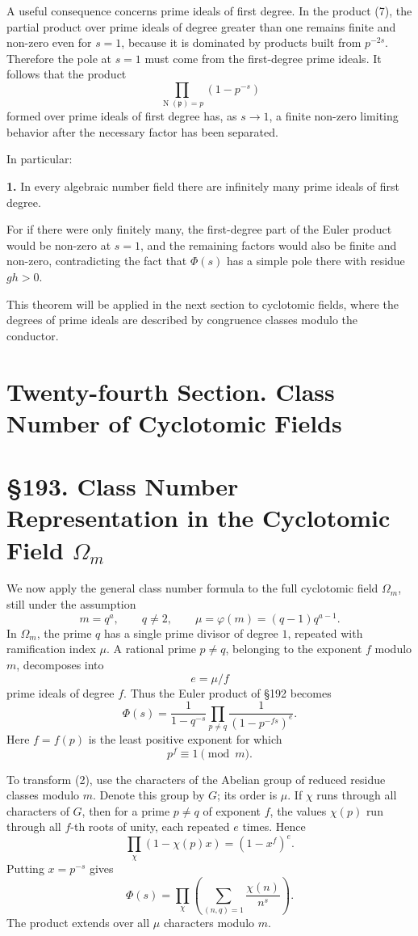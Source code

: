 \documentclass[12pt,a4paper]{article}
\newcommand{\webersection}[2]{\clearpage\section*{\S #1. #2}}
\newcommand{\booktitle}[1]{\clearpage\section*{#1}}
\newcommand{\Om}{\Omega_m}
\newcommand{\idealp}{\mathfrak p}
\newcommand{\N}{\operatorname{N}}
\begin{document}
A useful consequence concerns prime ideals of first degree.  In the product (7), the partial product over prime ideals of degree greater than one remains finite and non-zero even for \(s=1\), because it is dominated by products built from \(p^{-2s}\).  Therefore the pole at \(s=1\) must come from the first-degree prime ideals.  It follows that the product
\[
  \prod_{\N(\idealp)=p}
  (1-p^{-s})
\tag{10}
\]
formed over prime ideals of first degree has, as \(s\to1\), a finite non-zero limiting behavior after the necessary factor has been separated.

In particular:

\textbf{1.} In every algebraic number field there are infinitely many prime ideals of first degree.

For if there were only finitely many, the first-degree part of the Euler product would be non-zero at \(s=1\), and the remaining factors would also be finite and non-zero, contradicting the fact that \(\Phi(s)\) has a simple pole there with residue \(gh>0\).

This theorem will be applied in the next section to cyclotomic fields, where the degrees of prime ideals are described by congruence classes modulo the conductor.

\booktitle{Twenty-fourth Section. Class Number of Cyclotomic Fields}

\webersection{193}{Class Number Representation in the Cyclotomic Field \(\Om\)}

We now apply the general class number formula to the full cyclotomic field \(\Om\), still under the assumption
\[
  m=q^a,\qquad q\ne2,\qquad\mu=\varphi(m)=(q-1)q^{a-1}.
\tag{1}
\]
In \(\Om\), the prime \(q\) has a single prime divisor of degree \(1\), repeated with ramification index \(\mu\).  A rational prime \(p\ne q\), belonging to the exponent \(f\) modulo \(m\), decomposes into
\[
  e=\mu/f
\]
prime ideals of degree \(f\).  Thus the Euler product of \S192 becomes
\[
  \Phi(s)=\frac1{1-q^{-s}}
  \prod_{p\ne q}
  \frac1{(1-p^{-fs})^e}.
\tag{2}
\]
Here \(f=f(p)\) is the least positive exponent for which
\[
  p^f\equiv1\pmod m.
\tag{3}
\]

To transform (2), use the characters of the Abelian group of reduced residue classes modulo \(m\).  Denote this group by \(G\); its order is \(\mu\).  If \(\chi\) runs through all characters of \(G\), then for a prime \(p\ne q\) of exponent \(f\), the values \(\chi(p)\) run through all \(f\)-th roots of unity, each repeated \(e\) times.  Hence
\[
  \prod_\chi (1-\chi(p)x)=(1-x^f)^e.
\tag{4}
\]
Putting \(x=p^{-s}\) gives
\[
  \Phi(s)=
  \prod_{\chi}\left(\sum_{(n,q)=1}\frac{\chi(n)}{n^s}\right).
\tag{5}
\]
The product extends over all \(\mu\) characters modulo \(m\).
\end{document}
